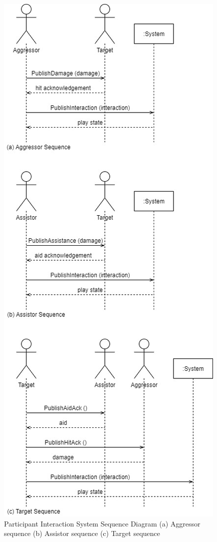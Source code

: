 \begin{figure}[H]
\centering
\includegraphics[scale=0.5]{images/ParticipantInteractionSequenceDiagram .jpg}
\caption{Participant Interaction System Sequence Diagram (a) Aggressor sequence (b) Assistor sequence (c) Target sequence}
\label{fig:ParticipantInteractionSequenceDiagram}
\end{figure}

